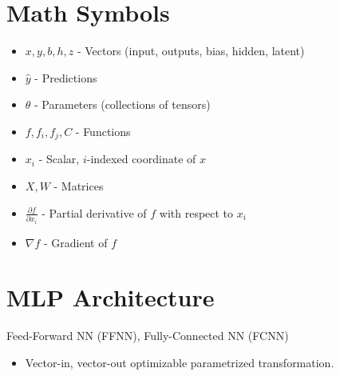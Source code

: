 \section{Math Symbols}
\begin{definition}
    \begin{itemize}
        \item \(x, y, b, h, z\) - Vectors (input, outputs, bias, hidden, latent)
        \item \(\hat{y}\) - Predictions
        \item \(\theta\) - Parameters (collections of tensors)
        \item \(f, f_i, f_j, C\) - Functions
        \item \(x_i\) - Scalar, \(i\)-indexed coordinate of \(x\)
        \item \(X, W\) - Matrices
        \item \(\frac{\partial f}{\partial x_i}\) - Partial derivative of \(f\) with respect to \(x_i\)
        \item \(\nabla f\) - Gradient of \(f\)
    \end{itemize}     
\end{definition}

\section{MLP Architecture}
\begin{definition}
    Feed-Forward NN (FFNN), Fully-Connected NN (FCNN)
    \begin{itemize}
        \item Vector-in, vector-out optimizable parametrized transformation. 
    \end{itemize}
\end{definition}

